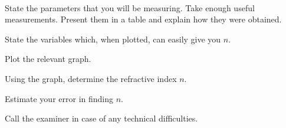 \documentclass[../TST.tex]{subfiles}
\begin{document}
\begin{eproblem}{\ \\[5pt]}
\begin{subpart}
	\item State the parameters that you will be measuring. Take enough useful measurements. Present them in a table and explain how they were obtained.  
	\item State the variables which, when plotted, can easily give you $n$. 
	\item Plot the relevant graph. 
	\item Using the graph, determine the refractive index $n$. 
	\item Estimate your error in finding $n$. 
\end{subpart}
Call the examiner in case of any technical difficulties.\\
\end{eproblem}
\end{document}
